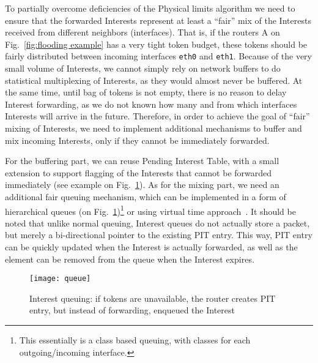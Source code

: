 

To partially overcome deficiencies of the Physical limits algorithm we need to ensure that the forwarded Interests represent at least a ``fair'' mix of the Interests received from different neighbors (interfaces).
That is, if the routers A on Fig.~\ref{fig:flooding example} has a very tight token budget, these tokens should be fairly distributed between incoming interfaces \texttt{eth0} and \texttt{eth1}.
Because of the very small volume of Interests, we cannot simply rely on network buffers to do statistical multiplexing of Interests, as they would almost never be buffered.
At the same time, until bag of tokens is not empty, there is no reason to delay Interest forwarding, as we do not known how many and from which interfaces Interests will arrive in the future.
Therefore, in order to achieve the goal of ``fair'' mixing of Interests, we need to implement additional mechanisms to buffer and mix incoming Interests, only if they cannot be immediately forwarded.

For the buffering part, we can reuse Pending Interest Table, with a small extension to support flagging of the Interests that cannot be forwarded immediately (see example on Fig.~\ref{fig:queueing}). 
As for the mixing part, we need an additional fair queuing mechanism, which can be implemented in a form of hierarchical queues (on Fig.~\ref{fig:queueing})\footnote{This essentially is a class based queuing, with classes for each outgoing/incoming interface.} or using virtual time approach~\cite{zhang1990virtual}. 
It should be noted that unlike normal queuing, Interest queues do not actually store a packet, but merely a bi-directional pointer to the existing PIT entry.
This way, PIT entry can be quickly updated when the Interest is actually forwarded, as well as the element can be removed from the queue when the Interest expires.

\begin{figure}[htbp]
  \centering
  \texttt{[image: queue]}
  \caption{Interest queuing: if tokens are unavailable, the router creates PIT entry, but instead of forwarding, enqueued the Interest}
  \label{fig:queueing}
\end{figure}

